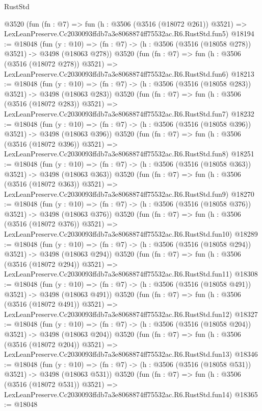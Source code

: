 \begin{lexlean}{RustStd}
\begin{coremodule}
    @3520
    (fun (fn : @7) =>
    fun (h : @3506 (@3516 (@18072 @261)) @3521) =>
    LexLeanPreserve.Cc2030093ffdb7a3e8068874ff75532ac.R6.RustStd.fun5)
@18194 := @18048
    (fun (y : @10) => (fn : @7) -> (h : @3506 (@3516 (@18058 @278)) @3521) -> @3498 (@18063 @278))
    @3520
    (fun (fn : @7) =>
    fun (h : @3506 (@3516 (@18072 @278)) @3521) =>
    LexLeanPreserve.Cc2030093ffdb7a3e8068874ff75532ac.R6.RustStd.fun6)
@18213 := @18048
    (fun (y : @10) => (fn : @7) -> (h : @3506 (@3516 (@18058 @283)) @3521) -> @3498 (@18063 @283))
    @3520
    (fun (fn : @7) =>
    fun (h : @3506 (@3516 (@18072 @283)) @3521) =>
    LexLeanPreserve.Cc2030093ffdb7a3e8068874ff75532ac.R6.RustStd.fun7)
@18232 := @18048
    (fun (y : @10) => (fn : @7) -> (h : @3506 (@3516 (@18058 @396)) @3521) -> @3498 (@18063 @396))
    @3520
    (fun (fn : @7) =>
    fun (h : @3506 (@3516 (@18072 @396)) @3521) =>
    LexLeanPreserve.Cc2030093ffdb7a3e8068874ff75532ac.R6.RustStd.fun8)
@18251 := @18048
    (fun (y : @10) => (fn : @7) -> (h : @3506 (@3516 (@18058 @363)) @3521) -> @3498 (@18063 @363))
    @3520
    (fun (fn : @7) =>
    fun (h : @3506 (@3516 (@18072 @363)) @3521) =>
    LexLeanPreserve.Cc2030093ffdb7a3e8068874ff75532ac.R6.RustStd.fun9)
@18270 := @18048
    (fun (y : @10) => (fn : @7) -> (h : @3506 (@3516 (@18058 @376)) @3521) -> @3498 (@18063 @376))
    @3520
    (fun (fn : @7) =>
    fun (h : @3506 (@3516 (@18072 @376)) @3521) =>
    LexLeanPreserve.Cc2030093ffdb7a3e8068874ff75532ac.R6.RustStd.fun10)
@18289 := @18048
    (fun (y : @10) => (fn : @7) -> (h : @3506 (@3516 (@18058 @294)) @3521) -> @3498 (@18063 @294))
    @3520
    (fun (fn : @7) =>
    fun (h : @3506 (@3516 (@18072 @294)) @3521) =>
    LexLeanPreserve.Cc2030093ffdb7a3e8068874ff75532ac.R6.RustStd.fun11)
@18308 := @18048
    (fun (y : @10) => (fn : @7) -> (h : @3506 (@3516 (@18058 @491)) @3521) -> @3498 (@18063 @491))
    @3520
    (fun (fn : @7) =>
    fun (h : @3506 (@3516 (@18072 @491)) @3521) =>
    LexLeanPreserve.Cc2030093ffdb7a3e8068874ff75532ac.R6.RustStd.fun12)
@18327 := @18048
    (fun (y : @10) => (fn : @7) -> (h : @3506 (@3516 (@18058 @204)) @3521) -> @3498 (@18063 @204))
    @3520
    (fun (fn : @7) =>
    fun (h : @3506 (@3516 (@18072 @204)) @3521) =>
    LexLeanPreserve.Cc2030093ffdb7a3e8068874ff75532ac.R6.RustStd.fun13)
@18346 := @18048
    (fun (y : @10) => (fn : @7) -> (h : @3506 (@3516 (@18058 @531)) @3521) -> @3498 (@18063 @531))
    @3520
    (fun (fn : @7) =>
    fun (h : @3506 (@3516 (@18072 @531)) @3521) =>
    LexLeanPreserve.Cc2030093ffdb7a3e8068874ff75532ac.R6.RustStd.fun14)
@18365 := @18048

\end{coremodule}
\end{lexlean}
